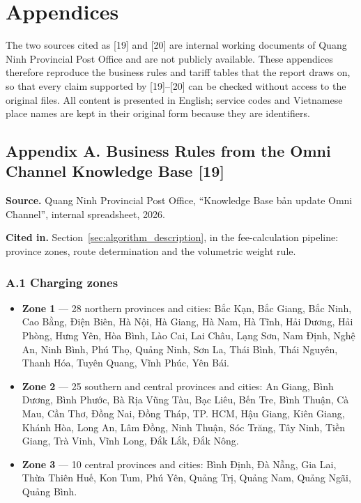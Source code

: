 \clearpage
{}
{}
\chapter*{Appendices}

\noindent The two sources cited as \mbox{[19]} and \mbox{[20]} are internal working documents of Quang Ninh Provincial Post Office and are not publicly available. These appendices therefore reproduce the business rules and tariff tables that the report draws on, so that every claim supported by \mbox{[19]--[20]} can be checked without access to the original files. All content is presented in English; service codes and Vietnamese place names are kept in their original form because they are identifiers.

\vspace{1em}

\section*{Appendix A. Business Rules from the Omni Channel Knowledge Base [19]}
{}

\noindent \textbf{Source.} Quang Ninh Provincial Post Office, ``Knowledge Base bản update Omni Channel'', internal spreadsheet, 2026.

\noindent \textbf{Cited in.} Section~\ref{sec:algorithm_description}, in the fee-calculation pipeline: province zones, route determination and the volumetric weight rule.

\subsection*{A.1 Charging zones}

\begin{itemize}
    \item \textbf{Zone 1} --- 28 northern provinces and cities: Bắc Kạn, Bắc Giang, Bắc Ninh, Cao Bằng, Điện Biên, Hà Nội, Hà Giang, Hà Nam, Hà Tĩnh, Hải Dương, Hải Phòng, Hưng Yên, Hòa Bình, Lào Cai, Lai Châu, Lạng Sơn, Nam Định, Nghệ An, Ninh Bình, Phú Thọ, Quảng Ninh, Sơn La, Thái Bình, Thái Nguyên, Thanh Hóa, Tuyên Quang, Vĩnh Phúc, Yên Bái.

    \item \textbf{Zone 2} --- 25 southern and central provinces and cities: An Giang, Bình Dương, Bình Phước, Bà Rịa Vũng Tàu, Bạc Liêu, Bến Tre, Bình Thuận, Cà Mau, Cần Thơ, Đồng Nai, Đồng Tháp, TP. HCM, Hậu Giang, Kiên Giang, Khánh Hòa, Long An, Lâm Đồng, Ninh Thuận, Sóc Trăng, Tây Ninh, Tiền Giang, Trà Vinh, Vĩnh Long, Đắk Lắk, Đắk Nông.

    \item \textbf{Zone 3} --- 10 central provinces and cities: Bình Định, Đà Nẵng, Gia Lai, Thừa Thiên Huế, Kon Tum, Phú Yên, Quảng Trị, Quảng Nam, Quảng Ngãi, Quảng Bình.
\end{itemize}

